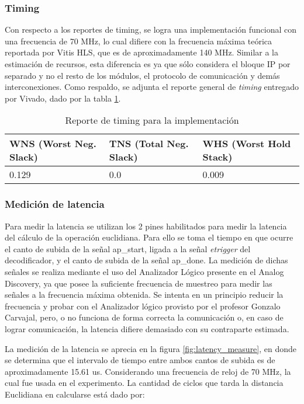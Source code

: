 \documentclass[conference]{IEEEtran}
\begin{document}
\subsubsection{Timing}

Con respecto a los reportes de timing, se logra una implementación funcional con una frecuencia de 70 MHz, lo cual difiere con la frecuencia máxima teórica reportada por Vitis HLS, que es de aproximadamente 140 MHz. Similar a la estimación de recursos, esta diferencia es ya que sólo considera el bloque IP por separado y no el resto de los módulos, el protocolo de comunicación y demás interconexiones. Como respaldo, se adjunta el reporte general de \textit{timing} entregado por Vivado, dado por la tabla \ref{tab:EUC_timing}.

\begin{table}[!ht]
    \centering
    \caption{Reporte de timing para la implementación}
    \label{tab:EUC_timing}
    \begin{tabular}{|l|l|l|}
    \hline
        WNS (Worst Neg. Slack) & TNS (Total Neg. Slack) & WHS (Worst Hold Stack) \\ \hline
        0.129 & 0.0 & 0.009 \\ \hline
    \end{tabular}
\end{table}

\subsubsection{Medición de latencia}

Para medir la latencia se utilizan los 2 pines habilitados para medir la latencia del cálculo de la operación euclidiana. Para ello se toma el tiempo en que ocurre el canto de subida de la señal ap\_start, ligada a la señal \textit{etrigger} del decodificador, y el canto de subida de la señal ap\_done. La medición de dichas señales se realiza mediante el uso del Analizador Lógico presente en el Analog Discovery, ya que posee la suficiente frecuencia de muestreo para medir las señales a la frecuencia máxima obtenida. Se intenta en un principio reducir la frecuencia y probar con el Analizador lógico provisto por el profesor Gonzalo Carvajal, pero, o no funciona de forma correcta la comunicación o, en caso de lograr comunicación, la latencia difiere demasiado con su contraparte estimada.

La medición de la latencia se aprecia en la figura \ref{fig:latency_measure}, en donde se determina que el intervalo de tiempo entre ambos cantos de subida es de aproximadamente 15.61 us. Considerando una frecuencia de reloj de 70 MHz, la cual fue usada en el experimento. La cantidad de ciclos que tarda la distancia Euclidiana en calcularse está dado por:
\end{document}
